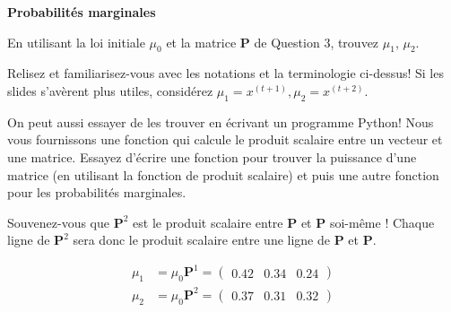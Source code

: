 \begin{Exercice}[7 minutes]\textbf{Probabilités marginales}

En utilisant la loi initiale $\mu_0$ et la matrice \textbf{P} de Question 3, trouvez $\mu_1$, $\mu_2$.

\begin{conseil}
    Relisez et familiarisez-vous avec les notations et la terminologie ci-dessus! Si les slides s'avèrent plus utiles, considérez $\mu_1 = x^{(t+1)}, \mu_2 = x^{(t+2)}$.
\end{conseil}

On peut aussi essayer de les trouver en écrivant un programme Python! Nous vous fournissons une fonction qui calcule le produit scalaire entre un vecteur et une matrice. Essayez d'écrire une fonction pour trouver la puissance d'une matrice (en utilisant la fonction de produit scalaire) et puis une autre fonction pour les probabilités marginales.



\begin{conseil}
    Souvenez-vous que $\mathbf{P}^2$ est le produit scalaire entre $\mathbf{P}$ et $\mathbf{P}$ soi-même ! Chaque ligne de  $\mathbf{P}^2$ sera donc le produit scalaire entre une ligne de $\mathbf{P}$ et $\mathbf{P}$.
\end{conseil}
\begin{solution}
\begin{align}
\mu_1 &= \mu_0 \mathbf{P}^1 =
\left(\begin{matrix}
0.42 & 0.34 & 0.24
\end{matrix}\right)\\
\mu_2 &= \mu_0 \mathbf{P}^2 =
\left(\begin{matrix}
0.37 & 0.31 & 0.32
\end{matrix}\right) 
\end{align}



\end{solution}

\end{Exercice}


